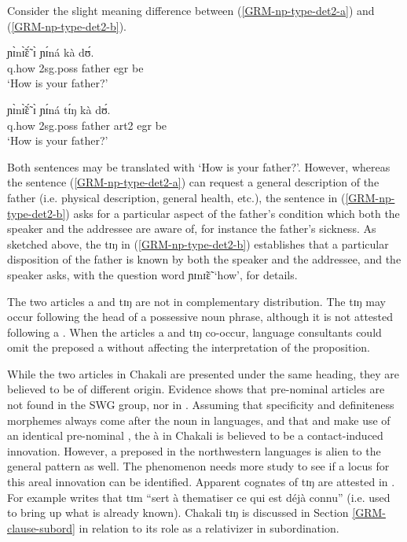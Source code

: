 \begin{exe}
\begin{exe}
\begin{exe}
\begin{exe}
\begin{exe}
\begin{exe}
Consider the slight meaning difference between
(\ref{GRM-np-type-det2-a}) and (\ref{GRM-np-type-det2-b}).


\ea\label{GRM-np-type-det2-ab}
 
  \ea\label{GRM-np-type-det2-a}
\gll ɲɪ̀nɪ̃̀ɛ̃́ ɪ̀ ɲɪ́ná kà dʊ́.\\
 {\sc q}.how {\sc 2sg.poss} father {\sc  egr} be\\
\glt  `How is your father?'

  \ex\label{GRM-np-type-det2-b}
\gll ɲɪ̀nɪ̃̀ɛ̃́ ɪ̀ ɲɪ́ná tɪ́ŋ kà dʊ́.\\
   {\sc q}.how {\sc 2sg.poss} father {\sc art2} {\sc  egr} be\\
\glt  `How is your father?'
  
 
\z 
 \z


Both sentences may be translated with `How is your father?'. However, whereas 
the sentence (\ref{GRM-np-type-det2-a}) can request  a general description
of the father (i.e.  physical description, general health, etc.), the sentence
in (\ref{GRM-np-type-det2-b}) asks for a particular aspect of the
father's condition which both the speaker and the addressee are aware of, for
instance the father's sickness. As sketched above, the  {\sls tɪŋ}  in
(\ref{GRM-np-type-det2-b}) establishes that a particular disposition of the
father is known  by both the speaker and the addressee,  and the speaker
asks, with the question word {\sls ɲɪnɪ̃ɛ̃} `how',   for details. 

The two  articles {\sls a} and {\sls tɪŋ}  are not in complementary 
distribution. The  {\sls tɪŋ} may occur following the head of a possessive noun phrase,
although it is not attested  following a . When the articles {\sls 
a} and {\sls tɪŋ} co-occur,  language consultants could omit
the preposed {\sls a}  without affecting the interpretation of the
 proposition. 

While the  two articles  in Chakali are presented under the same heading, they are  believed to be 
of different origin.  Evidence shows that pre-nominal articles are not found in the SWG group, nor 
in   \citep[153]{Bonv88}. Assuming that specificity and definiteness morphemes  always come 
after the noun in  languages, and that   and   make use of 
an 
 identical pre-nominal  {\sls }, the   {\sls à} in Chakali is believed to be a 
contact-induced innovation. However, a preposed  in the northwestern languages is alien to the general  pattern as well. The phenomenon needs more study to see if a locus for this areal  innovation can be identified. Apparent cognates of  {\sls tɪŋ} are attested in . For 
example   \citet[180]{Bonv88} writes that   {\sls tɪm}  ``sert à thematiser ce qui est 
déjà connu'' (i.e. used to bring up what is already known).  Chakali {\sls tɪŋ} is discussed in 
Section \ref{GRM-clause-subord}  in relation to its role as a relativizer in subordination.



\end{exe}
\end{exe}
\end{exe}
\end{exe}
\end{exe}
\end{exe}
